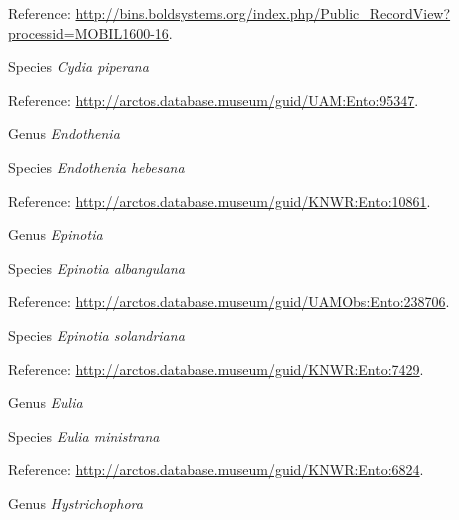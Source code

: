\documentclass[9pt, article]{memoir}
\begin{document}
\begin{multicols}{2}
\vspace{6pt}Reference: 
\url{http://bins.boldsystems.org/index.php/Public_RecordView?processid=MOBIL1600-16}.

\vspace{6pt}\noindent\hspace{36pt}Species \textit{Cydia piperana}


\vspace{6pt}Reference: 
\url{http://arctos.database.museum/guid/UAM:Ento:95347}.

\vspace{6pt}\noindent\hspace{30pt}Genus \textit{Endothenia}


\vspace{6pt}\noindent\hspace{36pt}Species \textit{Endothenia hebesana}


\vspace{6pt}Reference: 
\url{http://arctos.database.museum/guid/KNWR:Ento:10861}.

\vspace{6pt}\noindent\hspace{30pt}Genus \textit{Epinotia}


\vspace{6pt}\noindent\hspace{36pt}Species \textit{Epinotia albangulana}


\vspace{6pt}Reference: 
\url{http://arctos.database.museum/guid/UAMObs:Ento:238706}.

\vspace{6pt}\noindent\hspace{36pt}Species \textit{Epinotia solandriana}


\vspace{6pt}Reference: 
\url{http://arctos.database.museum/guid/KNWR:Ento:7429}.

\vspace{6pt}\noindent\hspace{30pt}Genus \textit{Eulia}


\vspace{6pt}\noindent\hspace{36pt}Species \textit{Eulia ministrana}


\vspace{6pt}Reference: 
\url{http://arctos.database.museum/guid/KNWR:Ento:6824}.

\vspace{6pt}\noindent\hspace{30pt}Genus \textit{Hystrichophora}



\end{multicols}
\end{document}
